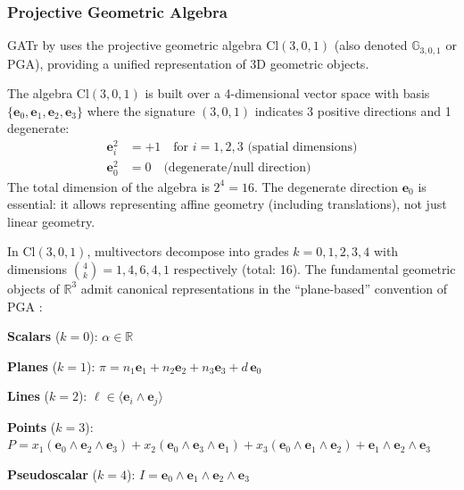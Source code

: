 \subsubsection{Projective Geometric Algebra}

GATr by \citet{brehmer2023geometric} uses the projective geometric algebra $\text{Cl}(3,0,1)$ (also denoted $\mathbb{G}_{3,0,1}$ or PGA), providing a unified representation of 3D geometric objects.

\begin{definition}\label{def:algebra_proyectiva_3d}
The algebra $\text{Cl}(3,0,1)$ is built over a 4-dimensional vector space with basis $\{\mathbf{e}_0, \mathbf{e}_1, \mathbf{e}_2, \mathbf{e}_3\}$ where the signature $(3,0,1)$ indicates 3 positive directions and 1 degenerate:
\begin{align}
    \mathbf{e}_i^2 &= +1 \quad \text{for } i = 1,2,3 \text{ (spatial dimensions)} \\
    \mathbf{e}_0^2 &= 0 \quad \text{(degenerate/null direction)}
\end{align}
The total dimension of the algebra is $2^4 = 16$. The degenerate direction $\mathbf{e}_0$ is essential: it allows representing affine geometry (including translations), not just linear geometry.
\end{definition}

\begin{proposition}\label{prop:representacion_unificada_gatr}
In $\text{Cl}(3,0,1)$, multivectors decompose into grades $k = 0, 1, 2, 3, 4$ with dimensions $\binom{4}{k} = 1, 4, 6, 4, 1$ respectively (total: 16). The fundamental geometric objects of $\mathbb{R}^3$ admit canonical representations in the ``plane-based'' convention of PGA \citep{brehmer2023geometric}:

\textbf{Scalars} ($k=0$): $\alpha \in \mathbb{R}$

\textbf{Planes} ($k=1$): $\pi = n_1 \mathbf{e}_1 + n_2 \mathbf{e}_2 + n_3 \mathbf{e}_3 + d\, \mathbf{e}_0$

\textbf{Lines} ($k=2$): $\ell \in \langle \mathbf{e}_i \wedge \mathbf{e}_j \rangle$

\textbf{Points} ($k=3$): $P = x_1 (\mathbf{e}_0 \wedge \mathbf{e}_2 \wedge \mathbf{e}_3) + x_2 (\mathbf{e}_0 \wedge \mathbf{e}_3 \wedge \mathbf{e}_1) + x_3 (\mathbf{e}_0 \wedge \mathbf{e}_1 \wedge \mathbf{e}_2) + \mathbf{e}_1 \wedge \mathbf{e}_2 \wedge \mathbf{e}_3$

\textbf{Pseudoscalar} ($k=4$): $I = \mathbf{e}_0 \wedge \mathbf{e}_1 \wedge \mathbf{e}_2 \wedge \mathbf{e}_3$
\end{proposition}

